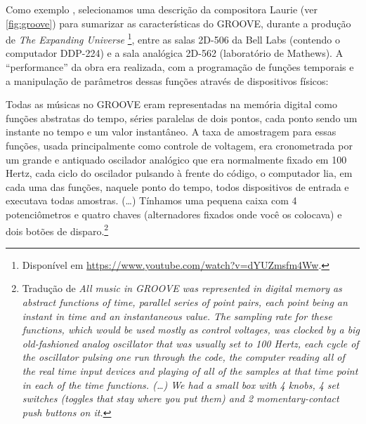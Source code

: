 Como exemplo , selecionamos uma descrição da compositora Laurie  (ver \autoref{fig:groove}) para sumarizar as características do GROOVE, durante a produção de \emph{The Expanding Universe} \footnote{Disponível em \url{https://www.youtube.com/watch?v=dYUZmsfm4Ww}.}, entre as salas 2D-506 da Bell Labs (contendo o computador DDP-224) e a sala analógica 2D-562 (laboratório de Mathews). A ``performance'' da obra era realizada, com a programação de funções temporais e a manipulação de parâmetros dessas funções através de dispositivos físicos:

\begin{citacao}
Todas as músicas no GROOVE eram representadas na memória digital como funções abstratas do tempo, séries paralelas de dois pontos, cada ponto sendo um instante no tempo e um valor instantâneo. A taxa de amostragem para essas funções, usada principalmente como controle de voltagem, era cronometrada por um grande e antiquado oscilador analógico que era normalmente fixado em 100 Hertz, cada ciclo do oscilador pulsando à frente do código, o computador lia, em cada uma das funções, naquele ponto do tempo, todos dispositivos de entrada e executava todas amostras. (\ldots) Tínhamos uma pequena caixa com 4 potenciômetros e quatro chaves (alternadores fixados onde você os colocava) e dois botões de disparo.\footnote{Tradução de \emph{All music in GROOVE was represented in digital memory as abstract functions of time, parallel series of point pairs, each point being an instant in time and an instantaneous value. The sampling rate for these functions, which would be used mostly as control voltages, was clocked by a big old-fashioned analog oscillator that was usually set to 100 Hertz, each cycle of the oscillator pulsing one run through the code, the computer reading all of the real time input devices and playing of all of the samples at that time point in each of the time functions. (\ldots)  We had a small box with 4 knobs, 4 set switches (toggles that stay where you put them) and 2 momentary-contact push buttons on it.}}
\end{citacao}

